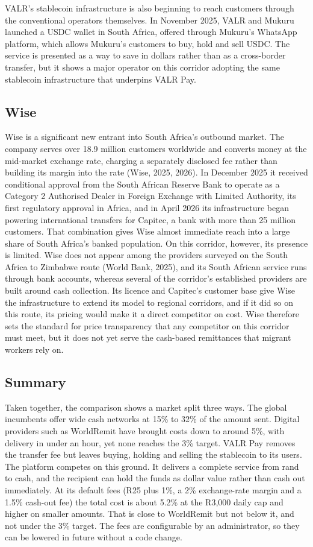 \documentclass[11pt,a4paper]{article}
\begin{document}
VALR's stablecoin infrastructure is also beginning to reach customers through the conventional operators themselves. In November 2025, VALR and Mukuru launched a USDC wallet in South Africa, offered through Mukuru's WhatsApp platform, which allows Mukuru's customers to buy, hold and sell USDC. The service is presented as a way to save in dollars rather than as a cross-border transfer, but it shows a major operator on this corridor adopting the same stablecoin infrastructure that underpins VALR Pay.

\subsection{Wise}
Wise is a significant new entrant into South Africa's outbound market. The company serves over 18.9 million customers worldwide and converts money at the mid-market exchange rate, charging a separately disclosed fee rather than building its margin into the rate (Wise, 2025, 2026). In December 2025 it received conditional approval from the South African Reserve Bank to operate as a Category 2 Authorised Dealer in Foreign Exchange with Limited Authority, its first regulatory approval in Africa, and in April 2026 its infrastructure began powering international transfers for Capitec, a bank with more than 25 million customers. That combination gives Wise almost immediate reach into a large share of South Africa's banked population. On this corridor, however, its presence is limited. Wise does not appear among the providers surveyed on the South Africa to Zimbabwe route (World Bank, 2025), and its South African service runs through bank accounts, whereas several of the corridor's established providers are built around cash collection. Its licence and Capitec's customer base give Wise the infrastructure to extend its model to regional corridors, and if it did so on this route, its pricing would make it a direct competitor on cost. Wise therefore sets the standard for price transparency that any competitor on this corridor must meet, but it does not yet serve the cash-based remittances that migrant workers rely on.

\subsection{Summary}
Taken together, the comparison shows a market split three ways. The global incumbents offer wide cash networks at 15\% to 32\% of the amount sent. Digital providers such as WorldRemit have brought costs down to around 5\%, with delivery in under an hour, yet none reaches the 3\% target. VALR Pay removes the transfer fee but leaves buying, holding and selling the stablecoin to its users. The platform competes on this ground. It delivers a complete service from rand to cash, and the recipient can hold the funds as dollar value rather than cash out immediately. At its default fees (R25 plus 1\%, a 2\% exchange-rate margin and a 1.5\% cash-out fee) the total cost is about 5.2\% at the R3,000 daily cap and higher on smaller amounts. That is close to WorldRemit but not below it, and not under the 3\% target. The fees are configurable by an administrator, so they can be lowered in future without a code change.
\end{document}
